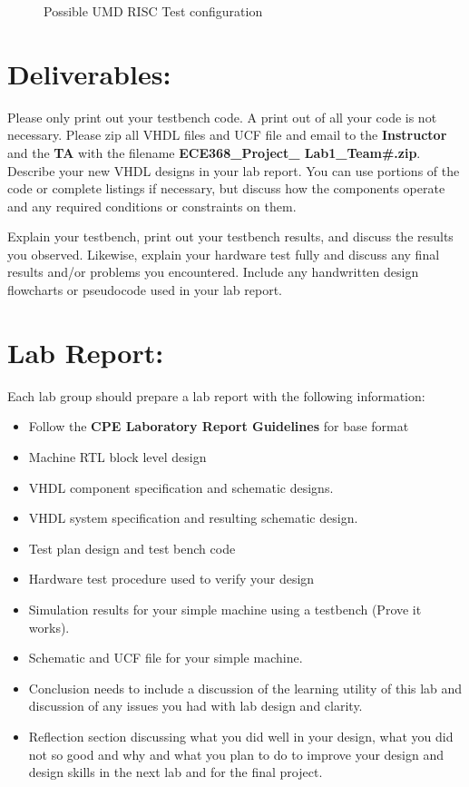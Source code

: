 \documentclass{article}
\begin{document}
\begin{figure}[!htbp]
  \centering
  \caption{Possible UMD RISC Test configuration}
  \label{fig:test_configuration}
\end{figure}

\section{Deliverables:}

Please only print out your testbench code. A print out of all your code is not necessary. Please zip all VHDL files and UCF file and email to the \textbf{Instructor} and the \textbf{TA} with the filename \textbf{ECE368\_Project\_ Lab1\_Team\#.zip}. Describe your new VHDL designs in your lab report. You can use portions of the code or complete listings if necessary, but discuss how the components operate and any required conditions or constraints on them.

Explain your testbench, print out your testbench results, and discuss the results you observed. Likewise, explain your hardware test fully and discuss any final results and/or problems you encountered. Include any handwritten design flowcharts or pseudocode used in your lab report.

\section{Lab Report:}

Each lab group should prepare a lab report with the following information:
\begin{itemize}
  \item Follow the \textbf{CPE Laboratory Report Guidelines} for base format
  \item Machine RTL block level design
  \item VHDL component specification and schematic designs.
  \item VHDL system specification and resulting schematic design.
  \item Test plan design and test bench code
  \item Hardware test procedure used to verify your design
  \item Simulation results for your simple machine using a testbench (Prove it works).
  \item Schematic and UCF file for your simple machine.
  \item Conclusion needs to include a discussion of the learning utility of this lab and discussion of any issues you had with lab design and clarity.
  \item Reflection section discussing what you did well in your design, what you did not so good and why and what you plan to do to improve your design and design skills in the next lab and for the final project.
\end{itemize}
\end{document}
